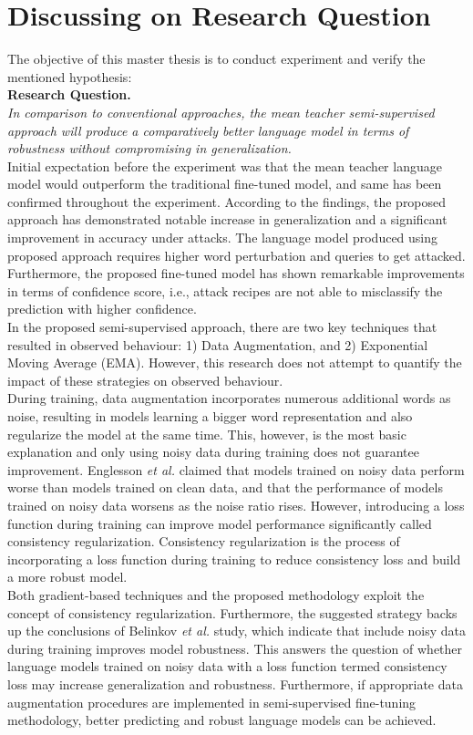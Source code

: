 \documentclass[%
	BCOR=8mm, %
	DIV=12,
	toc=bibliography, %
	toc=listof, %
	oneside, %
	egregdoesnotlikesansseriftitles, %
	]{scrbook}
\begin{document}
\section{Discussing on Research Question}
The objective of this master thesis is to conduct experiment and verify the mentioned hypothesis: \\
\textbf{Research Question.}\\
 \emph{In comparison to conventional approaches, the mean teacher semi-supervised approach will produce a comparatively better language model in terms of robustness without compromising in generalization.}\\
 Initial expectation before the experiment was that the mean teacher language model would outperform the traditional fine-tuned model, and same has been confirmed throughout the experiment.
 According to the findings, the proposed approach has demonstrated notable increase in generalization and a significant improvement in accuracy under attacks. The language model produced using proposed approach requires higher word perturbation and queries to get attacked. Furthermore, the proposed fine-tuned model has shown remarkable improvements in terms of confidence score, i.e., attack recipes are not able to misclassify the prediction with higher confidence.\\
In the proposed semi-supervised approach, there are two key techniques that resulted in observed behaviour: 1) Data Augmentation, and 2) Exponential Moving Average (EMA). However, this research does not attempt to quantify the impact of these strategies on observed behaviour. \\
During training, data augmentation incorporates numerous additional words as noise, resulting in models learning a bigger word representation and also regularize the model at the same time. This, however, is the most basic explanation and only using noisy data during training does not guarantee improvement. Englesson \textit{et al.} \cite{englesson_consistency_2021} claimed that models trained on noisy data perform worse than models trained on clean data, and that the performance of models trained on noisy data worsens as the noise ratio rises. However, introducing a loss function during training can improve model performance significantly called consistency regularization. Consistency regularization is the process of incorporating a loss function during training to reduce consistency loss and build a more robust model.\\
Both gradient-based techniques \cite{miyato_virtual_2018} and the proposed methodology exploit the concept of consistency regularization. Furthermore, the suggested strategy backs up the conclusions of Belinkov \textit{et al.} \cite{belinkov_synthetic_2018} study, which indicate that include noisy data during training improves model robustness. This answers the question of whether language models trained on noisy data with a loss function termed consistency loss may increase generalization and robustness. Furthermore, if appropriate data augmentation procedures are implemented in semi-supervised fine-tuning methodology, better predicting and robust language models can be achieved.\\
\end{document}
